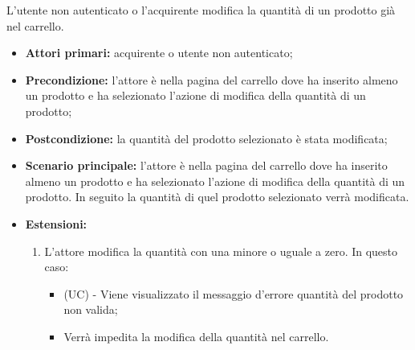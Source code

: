 
L'utente non autenticato o l'acquirente modifica la quantità di un prodotto già nel carrello.
\begin{itemize}
    \item \textbf{Attori primari:} acquirente o utente non autenticato;
    \item \textbf{Precondizione:} l'attore è nella pagina del carrello dove ha inserito almeno un prodotto e ha selezionato l'azione di modifica della quantità di un prodotto;
    \item \textbf{Postcondizione:} la quantità del prodotto selezionato è stata modificata;
    \item \textbf{Scenario principale:} l'attore è nella pagina del carrello dove ha inserito almeno un prodotto e ha selezionato l'azione di modifica della quantità di un prodotto. In seguito la quantità di quel prodotto selezionato verrà modificata.
    \item \textbf{Estensioni:}
    \begin{enumerate}[label=\lett]
        \item L'attore modifica la quantità con una minore o uguale a zero. In questo caso:
        \begin{itemize}
            \item (UC) - Viene visualizzato il messaggio d'errore quantità del prodotto non valida;
            \item Verrà impedita la modifica della quantità nel carrello.
        \end{itemize}
    \end{enumerate}
\end{itemize}

